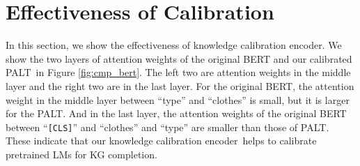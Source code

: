 \documentclass[11pt]{article}
\newcommand{\method}{\textsc{PALT}}
\newcommand{\calibration}{knowledge calibration encoder}
\newcommand{\textspt}[1]{\texttt{#1}}
\begin{document}
\section{Effectiveness of Calibration}
In this section, we show the effectiveness of \calibration. We show the two layers of attention weights of the original BERT and our calibrated \method\ in Figure \ref{fig:cmp_bert}. The left two are attention weights in the middle layer and the right two are in the last layer. For the original BERT, the attention weight in the middle layer between ``type'' and ``clothes'' is small, but it is larger for the \method. And in the last layer, the attention weights of the original BERT between ``\textspt{[CLS]}'' and ``clothes'' and ``type'' are smaller than those of \method. These indicate that our \calibration\ helps to calibrate pretrained LMs for KG completion.




 
\end{document}
